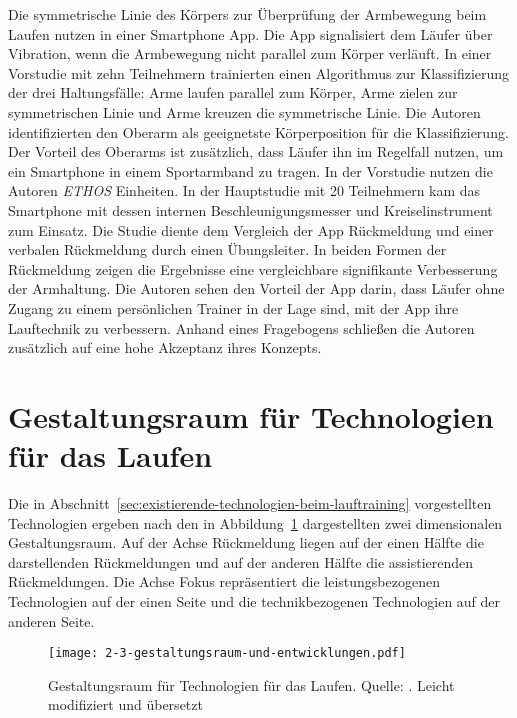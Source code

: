 Die symmetrische Linie des Körpers zur Überprüfung der Armbewegung beim Laufen nutzen \citet{Strohrmann2013, Strohrmann2014} in einer Smartphone App. Die App signalisiert dem Läufer über Vibration, wenn die Armbewegung nicht parallel zum Körper verläuft. In einer Vorstudie mit zehn Teilnehmern trainierten \citet{Strohrmann2013} einen Algorithmus zur Klassifizierung der drei Haltungsfälle: Arme laufen parallel zum Körper, Arme zielen zur symmetrischen Linie und Arme kreuzen die symmetrische Linie. Die Autoren identifizierten den Oberarm als geeignetste Körperposition für die Klassifizierung. Der Vorteil des Oberarms ist zusätzlich, dass Läufer ihn im Regelfall nutzen, um ein Smartphone in einem Sportarmband zu tragen. In der Vorstudie nutzen die Autoren \emph{ETHOS} Einheiten. In der Hauptstudie mit 20 Teilnehmern kam das Smartphone mit dessen internen Beschleunigungsmesser und Kreiselinstrument zum Einsatz. Die Studie diente dem Vergleich der App Rückmeldung und einer verbalen Rückmeldung durch einen Übungsleiter. In beiden Formen der Rückmeldung zeigen die Ergebnisse eine vergleichbare signifikante Verbesserung der Armhaltung. Die Autoren sehen den Vorteil der App darin, dass Läufer ohne Zugang zu einem persönlichen Trainer in der Lage sind, mit der App ihre Lauftechnik zu verbessern. Anhand eines Fragebogens schließen die Autoren zusätzlich auf eine hohe Akzeptanz ihres Konzepts.

\section{Gestaltungsraum für Technologien für das Laufen}
\label{sec:gestaltungsraum-fuer-technologien-fuer-das-laufen}
Die in Abschnitt~\ref{sec:existierende-technologien-beim-lauftraining} vorgestellten Technologien ergeben nach \citet[][]{Jensen2014} den in Abbildung~\ref{fig:2-3-gestaltungsraum-und-entwicklungen} dargestellten zwei dimensionalen Gestaltungsraum. Auf der Achse Rückmeldung liegen auf der einen Hälfte die darstellenden Rückmeldungen und auf der anderen Hälfte die assistierenden Rückmeldungen. Die Achse Fokus repräsentiert die leistungsbezogenen Technologien auf der einen Seite und die technikbezogenen Technologien auf der anderen Seite.

\begin{figure}[t]
	\centering
		\texttt{[image: 2-3-gestaltungsraum-und-entwicklungen.pdf]}
	\caption[Gestaltungsraum für Technologien für das Laufen]{Gestaltungsraum für Technologien für das Laufen. Quelle: \citet[][]{Jensen2014}. Leicht modifiziert und übersetzt}
	\label{fig:2-3-gestaltungsraum-und-entwicklungen}
\end{figure}

